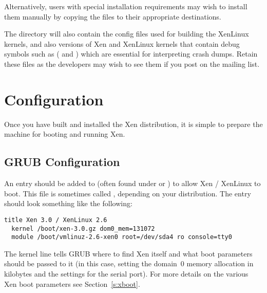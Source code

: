 Alternatively, users with special installation requirements may wish
to install them manually by copying the files to their appropriate
destinations.


The  directory will also contain the config
files used for building the XenLinux kernels, and also versions of Xen
and XenLinux kernels that contain debug symbols such as
( and ) which
are essential for interpreting crash dumps.  Retain these files as the
developers may wish to see them if you post on the mailing list.


\section{Configuration}
\label{s:configure}

Once you have built and installed the Xen distribution, it is simple
to prepare the machine for booting and running Xen.

\subsection{GRUB Configuration}

An entry should be added to  (often found under
 or ) to allow Xen / XenLinux to boot.
This file is sometimes called , depending on your
distribution.  The entry should look something like the following:

{\small
\begin{verbatim}
title Xen 3.0 / XenLinux 2.6
  kernel /boot/xen-3.0.gz dom0_mem=131072
  module /boot/vmlinuz-2.6-xen0 root=/dev/sda4 ro console=tty0
\end{verbatim}
}

The kernel line tells GRUB where to find Xen itself and what boot
parameters should be passed to it (in this case, setting the domain~0
memory allocation in kilobytes and the settings for the serial port).
For more details on the various Xen boot parameters see
Section~\ref{s:xboot}.

